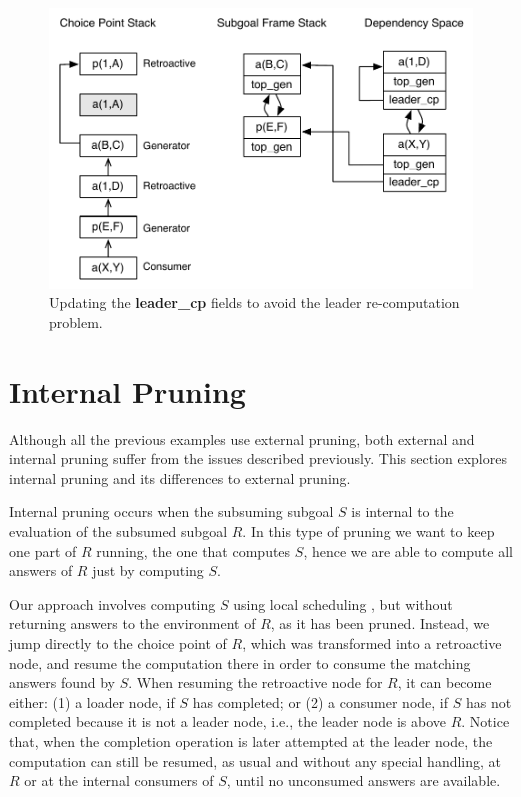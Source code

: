 \begin{figure}[ht]
  \centering
    \includegraphics[scale=0.6]{retro_leader_recomputation2.pdf}
  \caption{Updating the \textbf{leader\_cp} fields to avoid the leader re-computation problem.}
  \label{fig:retro_leader_recomputation2}
\end{figure}

\section{Internal Pruning}

Although all the previous examples use external pruning, both external and internal pruning
suffer from the issues described previously. This section explores internal pruning
and its differences to external pruning.

Internal pruning occurs when the subsuming subgoal $S$ is internal to the evaluation of the
subsumed subgoal $R$. In this type of pruning we want to keep one part of $R$ running, the one
that computes $S$, hence we are able to compute all answers of $R$ just by computing $S$.

Our approach involves computing $S$ using local scheduling \cite{Freire-96}, but without returning
answers to the environment of $R$, as it has been pruned. Instead, we jump directly to the
choice point of $R$, which was transformed into a retroactive node, and resume the computation there
in order to consume the matching answers found by $S$. When resuming the retroactive node for $R$, it
can become either: (1) a loader node, if $S$ has completed; or (2) a consumer node, if $S$ has not
completed because it is not a leader node, i.e., the leader node is above $R$.
Notice that, when the completion operation is later attempted at the leader node, the computation can
still be resumed, as usual and without any special handling, at $R$ or at the internal consumers of $S$,
until no unconsumed answers are available.

